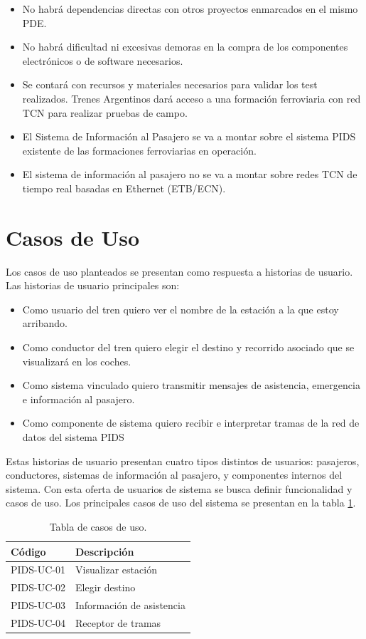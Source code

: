 \begin{itemize}
\item No habrá dependencias directas con otros proyectos enmarcados en el mismo PDE\cite{PDE-TCN}.
\item No habrá dificultad ni excesivas demoras en la compra de los componentes electrónicos o
de software necesarios.
\item Se contará con recursos y materiales necesarios para validar los test realizados.
Trenes Argentinos dará acceso a una formación ferroviaria con red TCN para realizar
pruebas de campo.
\item El Sistema de Información al Pasajero se va a montar sobre el sistema PIDS existente de
las formaciones ferroviarias en operación.
\item El sistema de información al pasajero no se va a montar sobre redes TCN de tiempo real
basadas en Ethernet (ETB/ECN).
\end{itemize}


\pagebreak
\section{Casos de Uso}
Los casos de uso planteados se presentan como respuesta a historias de usuario. Las historias de usuario principales son:
\begin{itemize}
\item Como usuario del tren quiero ver el nombre de la estación a la que estoy arribando.
\item Como conductor del tren quiero elegir el destino y recorrido asociado que se visualizará en los coches.
\item Como sistema vinculado quiero transmitir mensajes de asistencia, emergencia e información al pasajero.
\item Como componente de sistema quiero recibir e interpretar tramas de la red de datos del sistema PIDS
\end{itemize}

Estas historias de usuario presentan cuatro tipos distintos de usuarios: pasajeros, conductores, sistemas de información al pasajero, y componentes internos del sistema. Con esta oferta de usuarios de sistema se busca definir funcionalidad y casos de uso. Los principales casos de uso del sistema se presentan en la tabla \ref{tab:UseCases}. \\
 	
\begin{table}[htb]
\begin{tabular}{|l|l|}
\hline
\textbf{Código} & \textbf{Descripción}     \\ \hline
PIDS-UC-01  & Visualizar estación         \\ \hline
PIDS-UC-02  & Elegir destino             \\ \hline
PIDS-UC-03  & Información de asistencia \\ \hline
PIDS-UC-04  & Receptor de tramas       \\ \hline
\end{tabular}
	\caption{Tabla de casos de uso.}
	\label{tab:UseCases}
\end{table}

